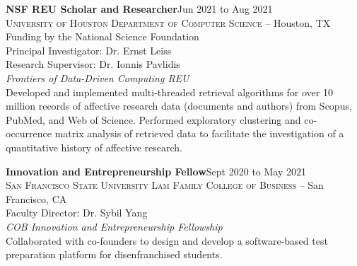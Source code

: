 \documentclass[hidelinks, 10pt]{article}
\def\contentblockspacing{2.5mm}     %
\begin{document}
\vspace{\contentblockspacing}
\begin{minipage}[ct]{0.9\linewidth}
    \textbf{NSF REU Scholar and Researcher}\hfill Jun 2021 to Aug 2021\\
    \textsc{University of Houston Department of Computer Science} -- Houston, TX\\
    Funding by the National Science Foundation\\
    Principal Investigator: Dr. Ernst Leiss\\
    Research Supervisor: Dr. Ionnis Pavlidis\vspace{1mm}\\
    {\textit{Frontiers of Data-Driven Computing REU}}\\
    Developed and implemented multi-threaded retrieval algorithms for over 10 million
    records of affective research data (documents and authors) from Scopus, PubMed,
    and Web of Science. Performed exploratory clustering and co-occurrence matrix
    analysis of retrieved data to facilitate the investigation of a quantitative history of
    affective research.
\end{minipage}

\vspace{\contentblockspacing}

\begin{minipage}[ct]{0.9\linewidth}
    \textbf{Innovation and Entrepreneurship Fellow}\hfill Sept 2020 to May 2021\\
    \textsc{San Francisco State University Lam Family College of Business} -- San Francisco, CA\\
    Faculty Director: Dr. Sybil Yang\vspace{1mm}\\
    {\textit{COB Innovation and Entrepreneurship Fellowship}}\\
    Collaborated with co-founders to design and develop a software-based test
    preparation platform for disenfranchised students.
\end{minipage}
\end{document}
